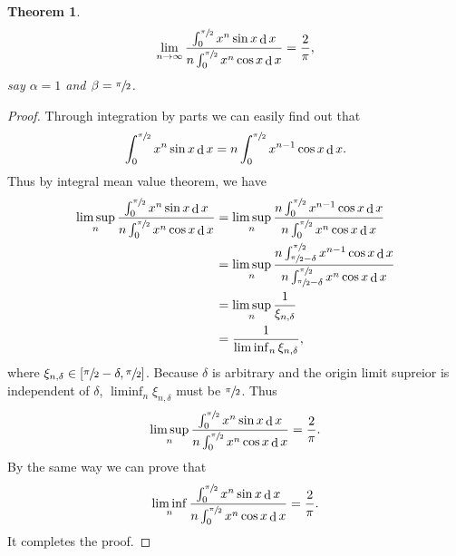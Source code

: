 \documentclass[a4paper, 12pt]{ctexart}
\newtheorem{theorem}{Theorem}[section]
\theoremstyle{plain}
\theoremstyle{plain}
\theoremstyle{plain}
\theoremstyle{nonumberplain}
\newtheorem{proof}{Proof}
\DeclareMathOperator*{\diff}{d}
\newcommand{\intsin}[2]{\int_{#1}^{#2}{x^{n}\sin{x}\diff x}}
\newcommand{\intcos}[2]{\int_{#1}^{#2}{x^{n}\cos{x}\diff x}}
\newcommand{\halfpi}{\sfrac{\pi}{2}}
\begin{document}
    \begin{theorem}
        \begin{equation}
            \lim_{n\to\infty}
            {\frac{\intsin{0}{\sfrac{\pi}{2}}}{n\intcos{0}{\sfrac{\pi}{2}}}}
            = \frac{2}{\pi},
        \end{equation}
        say $\alpha=1$ and $\beta=\halfpi$.
    \end{theorem}

    \begin{proof}
        Through integration by parts we can easily find out that
        \begin{equation}
            \intsin{0}{\halfpi} =
            n\int_{0}^{\halfpi}{x^{n-1}\cos{x}\diff x}.
        \end{equation}
        Thus by integral mean value theorem, we have
        \begin{equation}
        \begin{aligned}
            \limsup_{n}
            {\frac{\intsin{0}{\sfrac{\pi}{2}}}{n\intcos{0}{\sfrac{\pi}{2}}}}
            &=
            \limsup_{n}
            {\frac{n\int_{0}^{\halfpi}{x^{n-1}\cos{x}\diff x}}
            {n\intcos{0}{\sfrac{\pi}{2}}}}\\
            &=
            \limsup_{n}
            {\frac{n\int_{\halfpi-\delta}^{\halfpi}{x^{n-1}\cos{x}\diff x}}
            {n\intcos{\halfpi-\delta}{\halfpi}}}\\
            &= \limsup_{n}{\frac{1}{\xi_{n, \delta}}}\\
            &= \frac{1}{\liminf_{n}{\xi_{n, \delta}}},
        \end{aligned}
        \end{equation}
        where $\xi_{n, \delta}\in [\halfpi-\delta, \halfpi]$.
        Because $\delta$ is arbitrary and the origin limit supreior is
        independent of $\delta$,
        $\liminf_{n}{\xi_{n, \delta}}$ must be $\halfpi$.
        Thus
        \begin{equation}
            \limsup_{n}
            {\frac{\intsin{0}{\sfrac{\pi}{2}}}{n\intcos{0}{\sfrac{\pi}{2}}}}
            = \frac{2}{\pi}.
        \end{equation}
        By the same way we can prove that
        \begin{equation}
            \liminf_{n}
            {\frac{\intsin{0}{\sfrac{\pi}{2}}}{n\intcos{0}{\sfrac{\pi}{2}}}}
            = \frac{2}{\pi}.
        \end{equation}
        It completes the proof.
    \end{proof}


\end{document}

